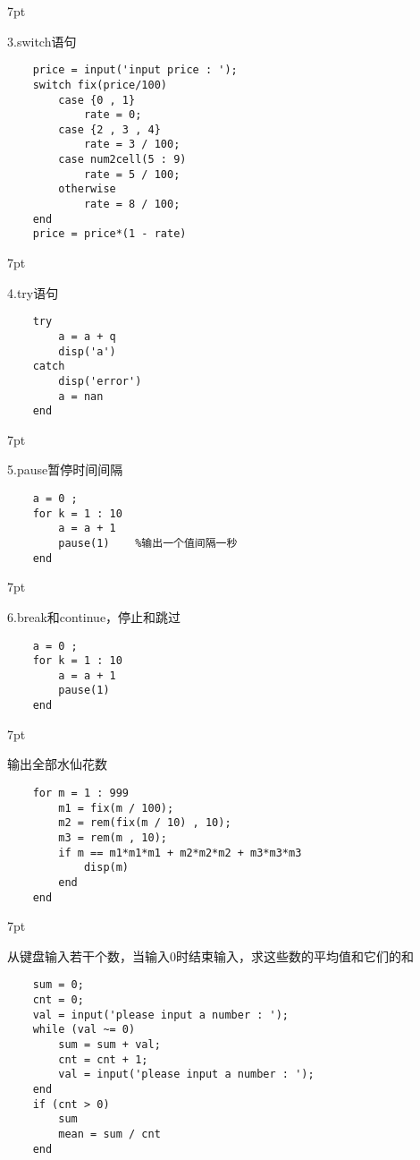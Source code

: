 \documentclass{article} %
\newenvironment{eg}{%
\def\FrameCommand{%
\hspace{1pt}%
{\color{Gray}\vrule width 2pt}%
{\color{egshade}\vrule width 4pt}%
\colorbox{egshade}%
}%
\MakeFramed{\advance\hsize-\width\FrameRestore}%
\noindent\hspace{-4.55pt}%
\begin{adjustwidth}{}{7pt}%
\vspace{2pt}\vspace{2pt}%
\normalfont %
}
{%
\vspace{2pt}\end{adjustwidth}\endMakeFramed%
}
\newenvironment{wa}{%
\def\FrameCommand{%
\hspace{1pt}%
{\color{LightCoral}\vrule width 2pt}%
{\color{washade}\vrule width 4pt}%
\colorbox{washade}%
}%
\MakeFramed{\advance\hsize-\width\FrameRestore}%
\noindent\hspace{-4.55pt}%
\begin{adjustwidth}{}{7pt}%
\vspace{2pt}\vspace{2pt}%
\normalfont %
}
{%
\vspace{2pt}\end{adjustwidth}\endMakeFramed%
}
\begin{document}
\begin{eg}
    3.switch语句
\end{eg}
\begin{lstlisting}
    price = input('input price : ');
    switch fix(price/100)
        case {0 , 1}
            rate = 0;
        case {2 , 3 , 4}
            rate = 3 / 100;
        case num2cell(5 : 9)
            rate = 5 / 100;
        otherwise
            rate = 8 / 100;
    end
    price = price*(1 - rate)
\end{lstlisting}

\begin{eg}
    4.try语句
\end{eg}
\begin{lstlisting}
    try
        a = a + q
        disp('a')
    catch
        disp('error')
        a = nan
    end
\end{lstlisting}

\begin{eg}
    5.pause暂停时间间隔
\end{eg}
\begin{lstlisting}
    a = 0 ;
    for k = 1 : 10
        a = a + 1 
        pause(1)    %输出一个值间隔一秒
    end
\end{lstlisting}

\begin{eg}
    6.break和continue，停止和跳过
\end{eg}
\begin{lstlisting}
    a = 0 ;
    for k = 1 : 10
        a = a + 1 
        pause(1)
    end
\end{lstlisting}

\begin{wa}
    输出全部水仙花数
\end{wa}
\begin{lstlisting}
    for m = 1 : 999
        m1 = fix(m / 100);
        m2 = rem(fix(m / 10) , 10);
        m3 = rem(m , 10);
        if m == m1*m1*m1 + m2*m2*m2 + m3*m3*m3
            disp(m)
        end
    end
\end{lstlisting}

\begin{wa}
    从键盘输入若干个数，当输入0时结束输入，求这些数的平均值和它们的和
\end{wa}
\begin{lstlisting}
    sum = 0;
    cnt = 0;
    val = input('please input a number : ');
    while (val ~= 0)
        sum = sum + val;
        cnt = cnt + 1;
        val = input('please input a number : ');
    end
    if (cnt > 0)
        sum
        mean = sum / cnt
    end
\end{lstlisting}
\end{document}
